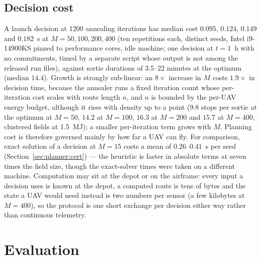 \documentclass[journal,outdir=./]{IEEEtran}
\begin{document}
\subsection{Decision cost}\label{sec:planner:cost}
A launch decision at 1200 annealing iterations has median cost $0.095$, $0.124$, $0.149$ and $0.182$~s at $M=50,100,200,400$ (ten repetitions each, distinct seeds, Intel i9-14900KS pinned to performance cores, idle machine; one decision at $t=1$~h with no commitments, timed by a separate script whose output is not among the released run files), against sortie durations of 3.5--22 minutes at the optimum (median $14.4$). Growth is strongly sub-linear: an $8\times$ increase in $M$ costs $1.9\times$ in decision time, because the annealer runs a fixed iteration count whose per-iteration cost scales with route length $n$, and $n$ is bounded by the per-UAV energy budget, although it rises with density up to a point ($9.8$ stops per sortie at the optimum at $M=50$, $14.2$ at $M=100$, $16.3$ at $M=200$ and $15.7$ at $M=400$, clustered fields at 1.5~MJ); a smaller per-iteration term grows with $M$. Planning cost is therefore governed mainly by how far a UAV can fly. For comparison, exact solution of a decision at $M=15$ costs a mean of $0.26$--$0.41$~s per seed (Section~\ref{sec:planner:cert}) --- the heuristic is faster in absolute terms at seven times the field size, though the exact-solver times were taken on a different machine. Computation may sit at the depot or on the airframe: every input a decision uses is known at the depot, a computed route is tens of bytes and the state a UAV would need instead is two numbers per sensor (a few kilobytes at $M=400$), so the protocol is one short exchange per decision either way rather than continuous telemetry.

\section{Evaluation}\label{sec:eval}
\end{document}

